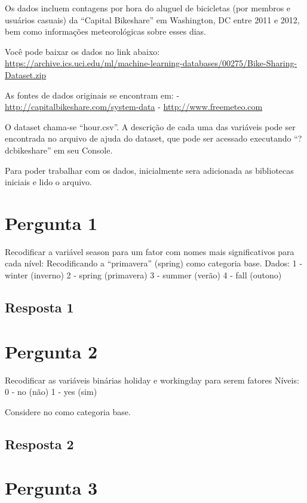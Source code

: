 \documentclass[
]{article}
\begin{document}
Os dados incluem contagens por hora do aluguel de bicicletas (por
membros e usuários casuais) da ``Capital Bikeshare'' em Washington, DC
entre 2011 e 2012, bem como informações meteorológicas sobre esses dias.

Você pode baixar os dados no link abaixo:
\url{https://archive.ics.uci.edu/ml/machine-learning-databases/00275/Bike-Sharing-Dataset.zip}

As fontes de dados originais se encontram em: -
\url{http://capitalbikeshare.com/system-data} -
\url{http://www.freemeteo.com}

O dataset chama-se ``hour.csv''. A descrição de cada uma das variáveis
pode ser encontrada no arquivo de ajuda do dataset, que pode ser
acessado executando ``?dcbikeshare'' em seu Console.

Para poder trabalhar com os dados, inicialmente sera adicionada as
bibliotecas iniciais e lido o arquivo.

\hypertarget{pergunta-1}{%
\section{Pergunta 1}\label{pergunta-1}}

Recodificar a variável season para um fator com nomes mais
significativos para cada nível: Recodificando a ``primavera'' (spring)
como categoria base. Dados: 1 - winter (inverno) 2 - spring (primavera)
3 - summer (verão) 4 - fall (outono)

\hypertarget{resposta-1}{%
\subsection{Resposta 1}\label{resposta-1}}

\hypertarget{pergunta-2}{%
\section{Pergunta 2}\label{pergunta-2}}

Recodificar as variáveis binárias holiday e workingday para serem
fatores Níveis: 0 - no (não) 1 - yes (sim)

Considere no como categoria base.

\hypertarget{resposta-2}{%
\subsection{Resposta 2}\label{resposta-2}}

\hypertarget{pergunta-3}{%
\section{Pergunta 3}\label{pergunta-3}}
\end{document}

